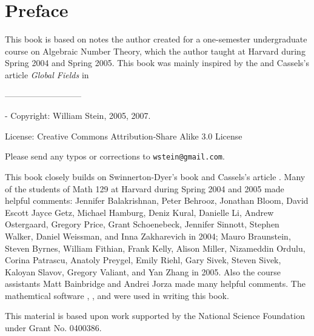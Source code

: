 \chapter*{Preface}

This book is based on notes the author created for a one-semester
undergraduate course on Algebraic Number Theory, which the author
taught at Harvard during Spring 2004 and Spring 2005.  This book was
mainly inspired by the \cite[Ch.~1]{sd:brief} and Cassels's article
{\em Global Fields} in \cite{cassels:global}

\vspace{0.3in}
\begin{center}
---------------------------
\end{center}-
\vspace{0.3in}
\noindent{}Copyright: William Stein, 2005, 2007.

\vspace{0.2in}
\noindent{}License: Creative Commons Attribution-Share Alike 3.0 License

\vspace{0.2in}
\noindent{}Please send any typos or corrections to {\tt wstein@gmail.com}.

\newpage
{} This book closely builds on
Swinnerton-Dyer's book \cite{sd:brief} and Cassels's article
\cite{cassels:global}. Many of the students of Math 129 at Harvard
during Spring 2004 and 2005 made helpful comments: Jennifer
Balakrishnan, Peter Behrooz, Jonathan Bloom, David Escott Jayce Getz,
Michael Hamburg, Deniz Kural, Danielle Li, Andrew Ostergaard, Gregory
Price, Grant Schoenebeck, Jennifer Sinnott, Stephen Walker, Daniel
Weissman, and Inna Zakharevich in 2004; Mauro Braunstein, Steven
Byrnes, William Fithian, Frank Kelly, Alison Miller, Nizameddin
Ordulu, Corina Patrascu, Anatoly Preygel, Emily Riehl, Gary Sivek,
Steven Sivek, Kaloyan Slavov, Gregory Valiant, and Yan Zhang in 2005.
Also the course assistants Matt Bainbridge and Andrei Jorza made many
helpful comments.  The mathemtical software \cite{sage}, \cite{pari},
and \cite{magma} were used in writing this book. 

\vspace{5ex}
\noindent{}This material is based upon work supported by the National Science
Foundation under Grant No. 0400386.




